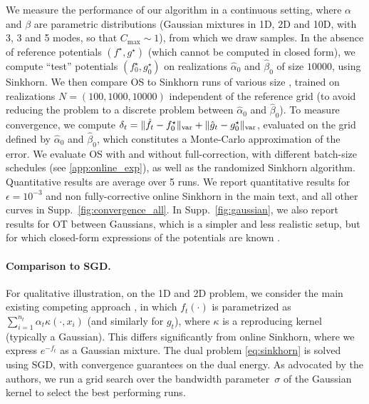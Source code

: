 We measure the performance of our algorithm in a
 continuous setting, where $\alpha$ and $\beta$ are  parametric
distributions (Gaussian mixtures in 1D, 2D and 10D, with 3, 3 and 5 modes, so
that $C_{\max} \sim 1$), from which we draw samples. In the absence of reference
potentials $(f^\star, g^\star)$ (which cannot be computed in closed form),
we compute ``test'' potentials $(f^\star_0, g^\star_0)$ on realizations $\hat
\alpha_0$ and $\hat \beta_0$ of size $10000$, using Sinkhorn. We then compare
OS to Sinkhorn runs of various size , trained on realizations $N=(100,1000,
10000)$ independent of the reference grid (to avoid reducing the problem to a
discrete problem between $\hat \alpha_0$ and $\hat \beta_0$). To measure
convergence, we compute $\delta_t = \Vert \hat f_t - f^\star_0 \Vert_{\text{\upshape var}} +
\Vert \hat g_t -  g_0^\star \Vert_{\text{\upshape var}}$, evaluated on the grid defined by
$\hat \alpha_0$ and $\hat \beta_0$, which constitutes a Monte-Carlo approximation of the error.
%
We evaluate OS with and without full-correction, with
different batch-size schedules (see \autoref{app:online_exp}), as well as the randomized Sinkhorn algorithm. Quantitative results are average over 5 runs. We report quantitative results for $\epsilon = 10^{-3}$ and non fully-corrective online Sinkhorn in the main text, and all other curves in Supp.~\autoref{fig:convergence_all}. In
Supp.~\autoref{fig:gaussian}, we also report results for OT between Gaussians, which is a simpler and less realistic setup, but for which closed-form expressions of the potentials are known \cite{janati_entropic_2020}.

\paragraph{Comparison to SGD.}\label{sec:compare}
%
For qualitative illustration, on the 1D and 2D problem, we consider the main existing competing
approach \citep{2016-genevay-nips}, in which $f_t(\cdot)$ is parametrized as
$\sum_{i=1}^{n_t} \alpha_t \kappa(\cdot, x_i)$ (and similarly for $g_t$), where
$\kappa$ is a reproducing kernel (typically a Gaussian). This differs
significantly from online Sinkhorn, where we express $e^{-f_t}$ as a Gaussian
mixture. The dual problem \eqref{eq:sinkhorn} is solved using SGD, with convergence guarantees on the dual energy.  As advocated
by the authors, we run a grid search over the bandwidth parameter~$\sigma$ of
the Gaussian kernel to select the best performing runs.


